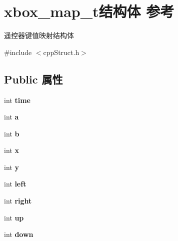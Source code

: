 \hypertarget{structxbox__map__t}{}\section{xbox\+\_\+map\+\_\+t结构体 参考}
\label{structxbox__map__t}


遥控器键值映射结构体  




{\ttfamily \#include $<$cpp\+Struct.\+h$>$}

\subsection*{Public 属性}
\begin{DoxyCompactItemize}
\item 
\mbox{\label{structxbox__map__t_a4e7a004e51945eb328592de5535fe60d}} 
int {\bfseries time}
\item 
\mbox{\label{structxbox__map__t_a15e505fa2f00568d2a2b93e1a09922fa}} 
int {\bfseries a}
\item 
\mbox{\label{structxbox__map__t_a2e28266a76570ab1e03fe41fe365ae23}} 
int {\bfseries b}
\item 
\mbox{\label{structxbox__map__t_a4a64d1fc4f517c27cb6f1f7f977d24d1}} 
int {\bfseries x}
\item 
\mbox{\label{structxbox__map__t_a1ac8926645064237fd2ea1224060b431}} 
int {\bfseries y}
\item 
\mbox{\label{structxbox__map__t_aa79e16e45abb5a3f5660c8304ea7ea92}} 
int {\bfseries left}
\item 
\mbox{\label{structxbox__map__t_a234531033b33ec4561a17920e5ffe245}} 
int {\bfseries right}
\item 
\mbox{\label{structxbox__map__t_a30a35ae89e93a016de396fd97f26e420}} 
int {\bfseries up}
\item 
\mbox{\label{structxbox__map__t_aba91ec3f92887fa0c69cb7696c299d26}} 
int {\bfseries down}

\end{DoxyCompactItemize}
